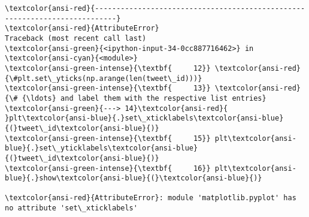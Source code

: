 \documentclass[11pt]{article}
\begin{document}
    \begin{Verbatim}[commandchars=\\\{\}, frame=single, framerule=2mm, rulecolor=\color{outerrorbackground}]
\textcolor{ansi-red}{---------------------------------------------------------------------------}
\textcolor{ansi-red}{AttributeError}                            Traceback (most recent call last)
\textcolor{ansi-green}{<ipython-input-34-0cc887716462>} in \textcolor{ansi-cyan}{<module>}
\textcolor{ansi-green-intense}{\textbf{     12}} \textcolor{ansi-red}{\#plt.set\_yticks(np.arange(len(tweet\_id)))}
\textcolor{ansi-green-intense}{\textbf{     13}} \textcolor{ansi-red}{\# {\ldots} and label them with the respective list entries}
\textcolor{ansi-green}{---> 14}\textcolor{ansi-red}{ }plt\textcolor{ansi-blue}{.}set\_xticklabels\textcolor{ansi-blue}{(}tweet\_id\textcolor{ansi-blue}{)}
\textcolor{ansi-green-intense}{\textbf{     15}} plt\textcolor{ansi-blue}{.}set\_yticklabels\textcolor{ansi-blue}{(}tweet\_id\textcolor{ansi-blue}{)}
\textcolor{ansi-green-intense}{\textbf{     16}} plt\textcolor{ansi-blue}{.}show\textcolor{ansi-blue}{(}\textcolor{ansi-blue}{)}

\textcolor{ansi-red}{AttributeError}: module 'matplotlib.pyplot' has no attribute 'set\_xticklabels'
    \end{Verbatim}

    \begin{center}
    \end{center}
    { \hspace*{\fill} \\}
    
\end{document}
